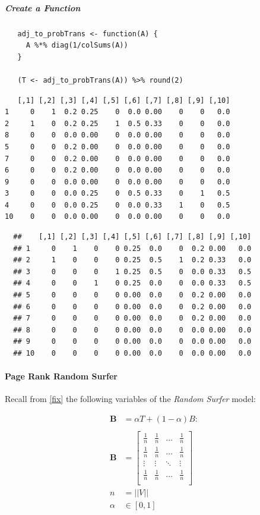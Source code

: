 \documentclass[11pt]{article}
\begin{document}
\subparagraph{Create a Function}
\label{create-a-function}
\begin{verbatim}
   adj_to_probTrans <- function(A) {
     A %*% diag(1/colSums(A))
   }

   (T <- adj_to_probTrans(A)) %>% round(2)
\end{verbatim}

\begin{verbatim}
   [,1] [,2] [,3] [,4] [,5] [,6] [,7] [,8] [,9] [,10]
1     0    1  0.2 0.25    0  0.0 0.00    0    0   0.0
2     1    0  0.2 0.25    1  0.5 0.33    0    0   0.0
8     0    0  0.0 0.00    0  0.0 0.00    0    0   0.0
5     0    0  0.2 0.00    0  0.0 0.00    0    0   0.0
7     0    0  0.2 0.00    0  0.0 0.00    0    0   0.0
6     0    0  0.2 0.00    0  0.0 0.00    0    0   0.0
9     0    0  0.0 0.00    0  0.0 0.00    0    0   0.0
3     0    0  0.0 0.25    0  0.5 0.33    0    1   0.5
4     0    0  0.0 0.25    0  0.0 0.33    1    0   0.5
10    0    0  0.0 0.00    0  0.0 0.00    0    0   0.0
\end{verbatim}

\begin{verbatim}
  ##    [,1] [,2] [,3] [,4] [,5] [,6] [,7] [,8] [,9] [,10]
  ## 1     0    1    0    0 0.25  0.0    0  0.2 0.00   0.0
  ## 2     1    0    0    0 0.25  0.5    1  0.2 0.33   0.0
  ## 3     0    0    0    1 0.25  0.5    0  0.0 0.33   0.5
  ## 4     0    0    1    0 0.25  0.0    0  0.0 0.33   0.5
  ## 5     0    0    0    0 0.00  0.0    0  0.2 0.00   0.0
  ## 6     0    0    0    0 0.00  0.0    0  0.2 0.00   0.0
  ## 7     0    0    0    0 0.00  0.0    0  0.2 0.00   0.0
  ## 8     0    0    0    0 0.00  0.0    0  0.0 0.00   0.0
  ## 9     0    0    0    0 0.00  0.0    0  0.0 0.00   0.0
  ## 10    0    0    0    0 0.00  0.0    0  0.0 0.00   0.0
\end{verbatim}

\paragraph{Page Rank Random Surfer}
\label{page-rank-random-surfer}
Recall from \ref{fix} the following variables of the \emph{Random Surfer} model:


\begin{align}
    \mathbf{B} &= \alpha T +  \left( 1- \alpha \right)B :\\
\ \\
    \mathbf{B}&= \begin{bmatrix}
    \frac{1}{n} & \frac{1}{n} & \ldots & \frac{1}{n} \\
    \frac{1}{n} & \frac{1}{n} & \ldots & \frac{1}{n} \\
        \vdots      & \vdots      & \ddots & \vdots  \\
    \frac{1}{n} & \frac{1}{n} & \ldots & \frac{1}{n} \\
    \end{bmatrix} \label{eq:bgval1} \\
    n&= \left| \left| V \right| \right| \\
    \alpha &\in [0,1]
\end{align}
\end{document}
